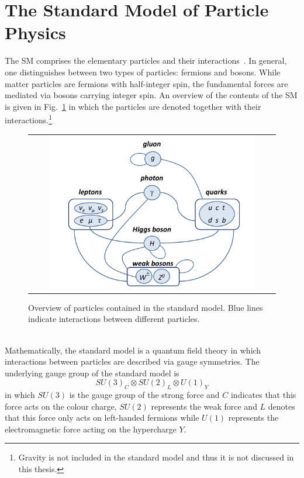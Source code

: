 \section{The Standard Model of Particle Physics}
\label{sec:sm}
The SM comprises the elementary particles and their interactions~\cite{Agashe:2014kda}. In general, one distinguishes between two types of particles: fermions and bosons. While matter particles are fermions with half-integer spin, the fundamental forces are mediated via bosons carrying integer spin. An overview of the contents of the SM is given in Fig.~\ref{fig:SM} in which the particles are denoted together with their interactions.\footnote{Gravity is not included in the standard model and thus it is not discussed in this thesis.} 
\begin{figure}[!tp]
  \centering 
  \begin{tabular}{c}
    \includegraphics[width=0.85\textwidth]{figures/StandardModell.pdf}
  \end{tabular}
  \caption{Overview of particles contained in the standard model. Blue lines indicate interactions between different particles.}
  \label{fig:SM}
\end{figure}
\\
Mathematically, the standard model is a quantum field theory in which interactions between particles are described via gauge symmetries. The underlying gauge group of the standard model is 
\begin{equation*}
SU(3)_{C} \otimes SU(2)_{L} \otimes U(1)_{Y} 
\end{equation*}
in which $SU(3)$ is the gauge group of the strong force and $C$ indicates that this force acts on the colour charge, $SU(2)$ represents the weak force and $L$ denotes that this force only acts on left-handed fermions while $U(1)$ represents the electromagnetic force acting on the hypercharge $Y$.\\
